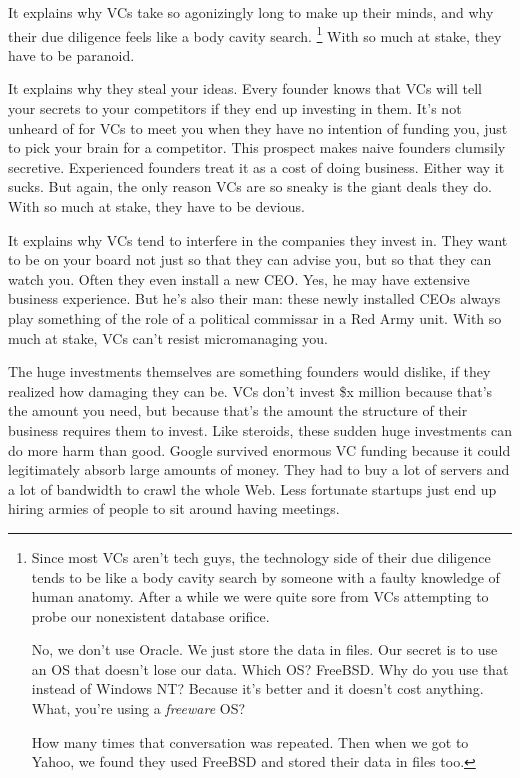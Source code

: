 \documentclass[12pt]{book}
\begin{document}
It explains why VCs take so agonizingly long to make up their minds, and
why their due diligence feels like a body cavity search. \footnote{Since most VCs aren't tech guys, the technology side of their
due diligence tends to be like a body cavity search by someone with a
faulty knowledge of human anatomy. After a while we were quite sore from
VCs attempting to probe our nonexistent database orifice.

No, we don't use Oracle. We just store the data in files. Our secret is
to use an OS that doesn't lose our data. Which OS? FreeBSD. Why do you
use that instead of Windows NT? Because it's better and it doesn't cost
anything. What, you're using a \emph{freeware} OS?

How many times that conversation was repeated. Then when we got to
Yahoo, we found they used FreeBSD and stored their data in files too.} With so
much at stake, they have to be paranoid.

It explains why they steal your ideas. Every founder knows that VCs will
tell your secrets to your competitors if they end up investing in them.
It's not unheard of for VCs to meet you when they have no intention of
funding you, just to pick your brain for a competitor. This prospect
makes naive founders clumsily secretive. Experienced founders treat it
as a cost of doing business. Either way it sucks. But again, the only
reason VCs are so sneaky is the giant deals they do. With so much at
stake, they have to be devious.

It explains why VCs tend to interfere in the companies they invest in.
They want to be on your board not just so that they can advise you, but
so that they can watch you. Often they even install a new CEO. Yes, he
may have extensive business experience. But he's also their man: these
newly installed CEOs always play something of the role of a political
commissar in a Red Army unit. With so much at stake, VCs can't resist
micromanaging you.

The huge investments themselves are something founders would dislike, if
they realized how damaging they can be. VCs don't invest \$x million
because that's the amount you need, but because that's the amount the
structure of their business requires them to invest. Like steroids,
these sudden huge investments can do more harm than good. Google
survived enormous VC funding because it could legitimately absorb large
amounts of money. They had to buy a lot of servers and a lot of
bandwidth to crawl the whole Web. Less fortunate startups just end up
hiring armies of people to sit around having meetings.
\end{document}
